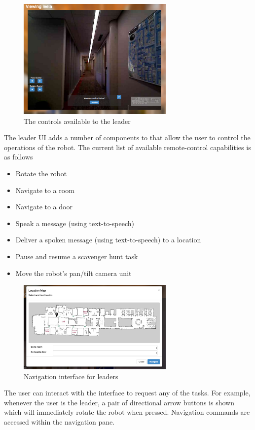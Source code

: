 \documentclass[
  oneside,
  11pt, a4paper,
  footinclude=true,
  headinclude=true,
  cleardoublepage=empty
]{article}
\begin{document}
\begin{figure}
  \centering
  \includegraphics[width=3in]{leader_ui}
  \caption{The controls available to the leader}
  \label{fig:leader_controls}
\end{figure}

The leader UI adds a number of components to that allow the user to control the
operations of the robot. The current list of available remote-control
capabilities is as follows

\begin{itemize}
  \item Rotate the robot
  \item Navigate to a room 
  \item Navigate to a door 
  \item Speak a message (using text-to-speech)
  \item Deliver a spoken message (using text-to-speech) to a location
  \item Pause and resume a scavenger hunt task
  \item Move the robot's pan/tilt camera unit
\end{itemize}

\begin{figure}
  \centering
  \includegraphics[width=3in]{nav_ui}
  \caption{Navigation interface for leaders}
  \label{fig:nav_interface}
\end{figure}

The user can interact with the interface to request any of the tasks. For
example, whenever the user is the leader, a pair of directional arrow buttons
is shown which will immediately rotate the robot when pressed. Navigation
commands are accessed within the navigation pane.
\end{document}
